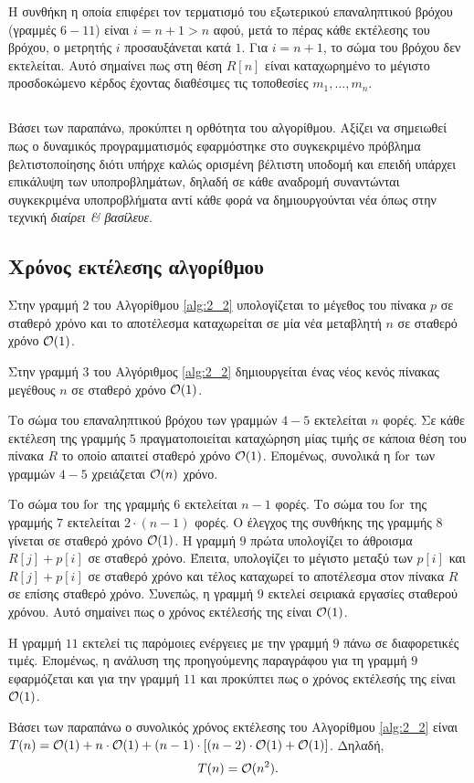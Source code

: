 			Η συνθήκη η οποία επιφέρει τον τερματισμό του εξωτερικού επαναληπτικού βρόχου (γραμμές $6-11$) είναι $i=n+1>n$ αφού, μετά το πέρας κάθε εκτέλεσης του βρόχου, ο μετρητής $i$ προσαυξάνεται κατά $1$. Για $i=n+1$, το σώμα του βρόχου δεν εκτελείται. Αυτό σημαίνει πως στη θέση $R[n]$ είναι καταχωρημένο το μέγιστο προσδοκώμενο κέρδος έχοντας διαθέσιμες τις τοποθεσίες $m_1,\ldots,m_n$.

		\vspace*{-18pt}
		\subsection*{}

			Βάσει των παραπάνω, προκύπτει η ορθότητα του αλγορίθμου. Αξίζει να σημειωθεί πως ο δυναμικός προγραμματισμός εφαρμόστηκε στο συγκεκριμένο πρόβλημα βελτιστοποίησης διότι υπήρχε καλώς ορισμένη βέλτιστη υποδομή και επειδή υπάρχει επικάλυψη των υποπροβλημάτων, δηλαδή σε κάθε αναδρομή συναντώνται συγκεκριμένα υποπροβλήματα αντί κάθε φορά να δημιουργούνται νέα όπως στην τεχνική \textsl{διαίρει \& βασίλευε}.

\subsection{Χρόνος εκτέλεσης αλγορίθμου}

Στην γραμμή $2$ του Αλγορίθμου \ref{alg:2_2} υπολογίζεται το μέγεθος του πίνακα $p$ σε σταθερό χρόνο και το αποτέλεσμα καταχωρείται σε μία νέα μεταβλητή $n$ σε σταθερό χρόνο $\mathcal{O}(1)$.\par
Στην γραμμή $3$ του Αλγόριθμος \ref{alg:2_2} δημιουργείται ένας νέος κενός πίνακας μεγέθους $n$ σε σταθερό χρόνο $\mathcal{O}(1)$.\par
Το σώμα του επαναληπτικού βρόχου των γραμμών $4-5$ εκτελείται $n$ φορές. Σε κάθε εκτέλεση της γραμμής $5$ πραγματοποιείται καταχώρηση μίας τιμής σε κάποια θέση του πίνακα $R$ το οποίο απαιτεί σταθερό χρόνο $\mathcal{O}(1)$. Επομένως, συνολικά η $\text{{for}}$ των γραμμών $4-5$ χρειάζεται $\mathcal{O}(n)$ χρόνο.\par
Το σώμα του $\text{{for}}$ της γραμμής $6$ εκτελείται $n-1$ φορές. Το σώμα του $\text{{for}}$ της γραμμής $7$ εκτελείται $2\cdot(n-1)$ φορές. Ο έλεγχος της συνθήκης της γραμμής $8$ γίνεται σε σταθερό χρόνο $\mathcal{O}(1)$. Η γραμμή $9$ πρώτα υπολογίζει το άθροισμα $R[j]+p[i]$ σε σταθερό χρόνο. Έπειτα, υπολογίζει το μέγιστο μεταξύ των $p[i]$ και $R[j]+p[i]$ σε σταθερό χρόνο και τέλος καταχωρεί το αποτέλεσμα στον πίνακα $R$ σε επίσης σταθερό χρόνο. Συνεπώς, η γραμμή $9$ εκτελεί σειριακά εργασίες σταθερού χρόνου. Αυτό σημαίνει πως ο χρόνος εκτέλεσής της είναι $\mathcal{O}(1)$.\par
Η γραμμή $11$ εκτελεί τις παρόμοιες ενέργειες με την γραμμή $9$ πάνω σε διαφορετικές τιμές. Επομένως, η ανάλυση της προηγούμενης παραγράφου για τη γραμμή $9$ εφαρμόζεται και για την γραμμή $11$ και προκύπτει πως ο χρόνος εκτέλεσής της είναι $\mathcal{O}(1)$.\par
Βάσει των παραπάνω ο συνολικός χρόνος εκτέλεσης του Αλγορίθμου \ref{alg:2_2} είναι $T(n)=\mathcal{O}(1)+n\cdot\mathcal{O}(1)+(n-1)\cdot\left[(n-2)\cdot\mathcal{O}(1)+\mathcal{O}(1)\right]$. Δηλαδή,
\begin{equation}
	T(n)=\mathcal{O}(n^2).
\end{equation}